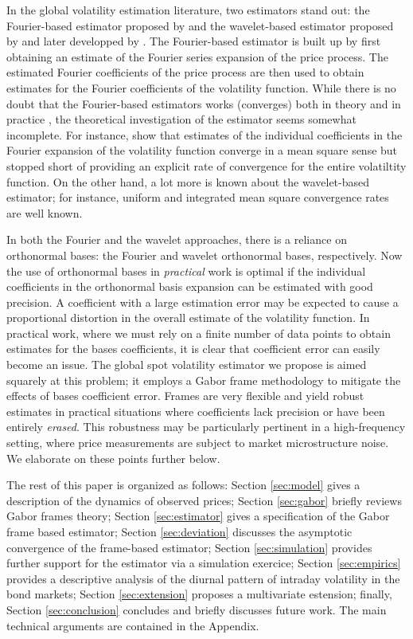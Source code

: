 In the global volatility estimation literature, two estimators stand out: the Fourier-based estimator proposed by \cite{Malliavin2002} and the wavelet-based estimator proposed by \cite{GenonCatalot1992} and later developped by \cite{Hoffmann2012}. The Fourier-based  estimator is built up  by first obtaining an estimate of  the Fourier series expansion  of the price process. The estimated Fourier coefficients of the price process are then used to obtain estimates for the Fourier coefficients of the volatility function. While there is no doubt that the Fourier-based estimators works (converges) both in theory and in practice \citep[See][]{Malliavin2007,Malliavin2009}, the theoretical investigation of the estimator seems somewhat incomplete.
For instance, \citeauthor{Malliavin2002} show that estimates of the individual coefficients  in the Fourier expansion of the volatility function converge in a mean square sense but  stopped short of providing an explicit rate of convergence for the entire volatiltity function. On the other hand,  a lot more is known about the wavelet-based estimator; for instance, uniform and integrated mean square convergence rates are well known.  

In both the Fourier and the wavelet approaches, there is a reliance  on orthonormal bases: the Fourier and wavelet orthonormal bases, respectively.   Now the use of orthonormal bases  in \emph{practical} work is optimal  if  the  individual coefficients in the orthonormal basis expansion can be estimated with good precision. A coefficient with a large estimation error may be expected to cause a proportional distortion in the overall estimate of the volatility function. In practical work, where  we must rely on a finite  number of data points to obtain estimates for the bases coefficients, it is  clear that coefficient error can easily become an issue. The global spot volatility estimator we propose  is aimed squarely at this problem; it  employs a Gabor frame methodology to mitigate the effects of bases coefficient error. Frames are very flexible and yield robust estimates in practical situations where coefficients lack  precision or have been entirely \emph{erased}.  This robustness may be  particularly pertinent in a high-frequency setting, where price measurements are subject to market microstructure noise. We elaborate on these points further below.

The rest of this paper is organized as follows: Section \ref{sec:model} gives a description of the dynamics of  observed prices; Section \ref{sec:gabor} briefly reviews  Gabor frames theory; Section \ref{sec:estimator} gives a specification of the Gabor frame based estimator; Section \ref{sec:deviation} discusses the asymptotic convergence of the frame-based estimator; Section \ref{sec:simulation} provides further support for the estimator via a simulation exercice; Section \ref{sec:empirics} provides a descriptive analysis of the diurnal pattern of intraday volatility in the bond  markets; Section \ref{sec:extension} proposes a multivariate estension; finally,  Section \ref{sec:conclusion} concludes and briefly discusses future work. The main technical arguments  are contained in the Appendix.
